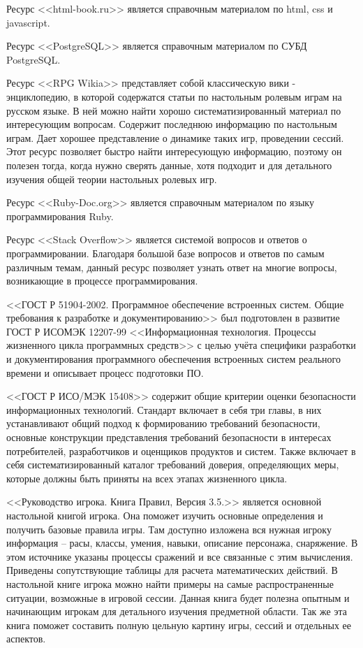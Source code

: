 Ресурс <<html-book.ru>> является справочным материалом по html, css и javascript.

Ресурс <<PostgreSQL>> является справочным материалом по СУБД PostgreSQL.

Ресурс <<RPG Wikia>> представляет собой классическую вики - энциклопедию, в которой содержатся статьи по настольным ролевым играм на русском языке. В ней можно найти хорошо систематизированный материал по интересующим вопросам. Содержит последнюю информацию по настольным играм. Дает хорошее представление о динамике таких игр, проведении сессий. Этот ресурс позволяет быстро найти интересующую информацию, поэтому он полезен тогда, когда нужно сверять данные, хотя подходит и для детального изучения общей теории настольных ролевых игр.

Ресурс <<Ruby-Doc.org>> является справочным материалом по языку программирования Ruby.

Ресурс <<Stack Overflow>> является системой вопросов и ответов о программировании. Благодаря большой базе вопросов и ответов по самым различным темам, данный ресурс позволяет узнать ответ на многие вопросы, возникающие в процессе программирования.

<<ГОСТ Р 51904-2002. Программное обеспечение встроенных систем. Общие требования к разработке и документированию>> был подготовлен в развитие ГОСТ Р ИСО\/МЭК 12207-99 <<Информационная технология. Процессы жизненного цикла программных средств>> с целью учёта специфики разработки и документирования программного обеспечения встроенных систем реального времени и описывает процесс подготовки ПО.

<<ГОСТ Р ИСО/МЭК 15408>> содержит общие критерии оценки безопасности информационных технологий. Стандарт включает в себя три главы, в них устанавливают общий подход к формированию требований безопасности, основные конструкции представления требований безопасности в интересах потребителей, разработчиков и оценщиков продуктов и систем. Также включает в себя систематизированный каталог требований доверия, определяющих меры, которые должны быть приняты на всех этапах жизненного цикла.

<<Руководство игрока. Книга Правил, Версия 3.5.>> является основной настольной книгой игрока. Она поможет изучить основные определения и получить базовые правила игры. Там доступно изложена вся нужная игроку информация – расы, классы, умения, навыки, описание персонажа, снаряжение. В этом источнике указаны процессы сражений и все связанные с этим вычисления. Приведены сопутствующие таблицы для расчета математических действий. В настольной книге игрока можно найти примеры на самые распространенные ситуации, возможные в игровой сессии. Данная книга будет полезна опытным и начинающим игрокам для детального изучения предметной области. Так же эта книга поможет составить полную цельную картину игры, сессий и отдельных ее аспектов.
